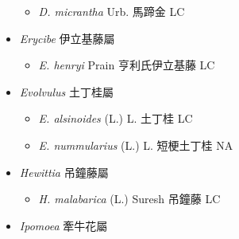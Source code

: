 \begin{itemize}
  \begin{itemize}
        \item[] \textit{D. micrantha} Urb.  馬蹄金   LC
  \end{itemize}
 \item[] \textit{Erycibe} 伊立基藤屬
                                
  \begin{itemize}
        \item[] \textit{E. henryi} Prain  亨利氏伊立基藤   LC
  \end{itemize}
 \item[] \textit{Evolvulus} 土丁桂屬
                                
  \begin{itemize}
        \item[] \textit{E. alsinoides} (L.) L.  土丁桂   LC
        \item[] \textit{E. nummularius} (L.) L.  短梗土丁桂   NA
  \end{itemize}
 \item[] \textit{Hewittia} 吊鐘藤屬
                                
  \begin{itemize}
        \item[] \textit{H. malabarica} (L.) Suresh  吊鐘藤   LC
  \end{itemize}
 \item[] \textit{Ipomoea} 牽牛花屬
                                

\end{itemize}
